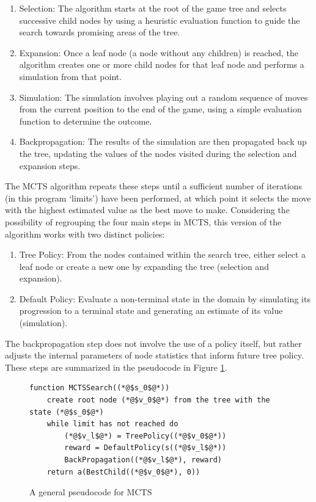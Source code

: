 \begin{enumerate}
	\item Selection: The algorithm starts at the root of the game tree and selects successive child nodes by using a heuristic evaluation function to guide the search towards promising areas of the tree.
	
	\item Expansion: Once a leaf node (a node without any children) is reached, the algorithm creates one or more child nodes for that leaf node and performs a simulation from that point.
	
	\item Simulation: The simulation involves playing out a random sequence of moves from the current position to the end of the game, using a simple evaluation function to determine the outcome.
	
	\item Backpropagation: The results of the simulation are then propagated back up the tree, updating the values of the nodes visited during the selection and expansion steps.
	
\end{enumerate}

The MCTS algorithm repeats these steps until a sufficient number of iterations (in this program `limits') have been performed, at which point it selects the move with the highest estimated value as the best move to make. Considering the possibility of regrouping the four main steps in MCTS, this version of the algorithm works with two distinct policies: 

\begin{enumerate}
	\item Tree Policy: From the nodes contained within the search tree, either select a leaf node or create a new one by expanding the tree (selection and expansion).
	
	\item Default Policy: Evaluate a non-terminal state in the domain by simulating its progression to a terminal state and generating an estimate of its value (simulation).
\end{enumerate}

The backpropagation step does not involve the use of a policy itself, but rather adjusts the internal parameters of node statistics that inform future tree policy. These steps are summarized in the pseudocode in Figure \ref{fig:mctsGeneral}.


\begin{figure}[h]
\captionsetup{justification=centering}
\begin{lstlisting}
function MCTSSearch((*@$s_0$@*))
    create root node (*@$v_0$@*) from the tree with the state (*@$s_0$@*)
    while limit has not reached do
        (*@$v_l$@*) = TreePolicy((*@$v_0$@*))
        reward = DefaultPolicy(s((*@$v_l$@*))
        BackPropagation((*@$v_l$@*), reward)
    return a(BestChild((*@$v_0$@*), 0))
\end{lstlisting}
\caption{A general pseudocode for MCTS}
\label{fig:mctsGeneral}
\end{figure}

